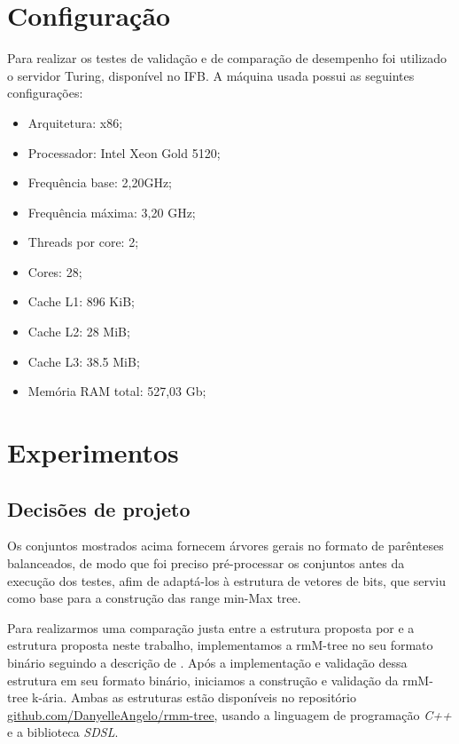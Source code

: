 \section{Configuração}\label{sec:configuracao}
Para realizar os testes de validação e de comparação de desempenho foi utilizado o servidor Turing, disponível no IFB. A máquina usada possui as seguintes configurações:
\begin{itemize}
    \item Arquitetura: x86;
    \item Processador: Intel Xeon Gold 5120;
    \item Frequência base: 2,20GHz;
    \item Frequência máxima: 3,20 GHz;
    \item Threads por core: 2;
    \item Cores: 28;
    \item Cache L1: 896 KiB;
    \item Cache L2: 28 MiB;
    \item Cache L3: 38.5 MiB;
    \item Memória RAM total: 527,03 Gb;
\end{itemize}

\section{Experimentos}\label{sec:experimentos}
\subsection{Decisões de projeto}\label{subsec:decision}
Os conjuntos mostrados acima fornecem árvores gerais no formato de parênteses balanceados, de modo que foi preciso pré-processar os conjuntos antes da execução dos testes, afim de adaptá-los à estrutura de vetores de bits, que serviu como base para a construção das range min-Max tree.

Para realizarmos uma comparação justa entre a estrutura proposta por \citet{paper-fully-functinal-succint-trees} e a estrutura proposta neste trabalho,  implementamos a rmM-tree no seu formato binário seguindo a descrição de \citet{book-compact-data-structures}. Após a implementação e validação dessa estrutura em seu formato binário, iniciamos a construção e validação da rmM-tree k-ária. Ambas as estruturas estão disponíveis no repositório \href{https://github.com/DanyelleAngelo/rmm-tree}{github.com/DanyelleAngelo/rmm-tree}, usando a linguagem de programação \textit{C++} e a biblioteca \textit{SDSL}. 

